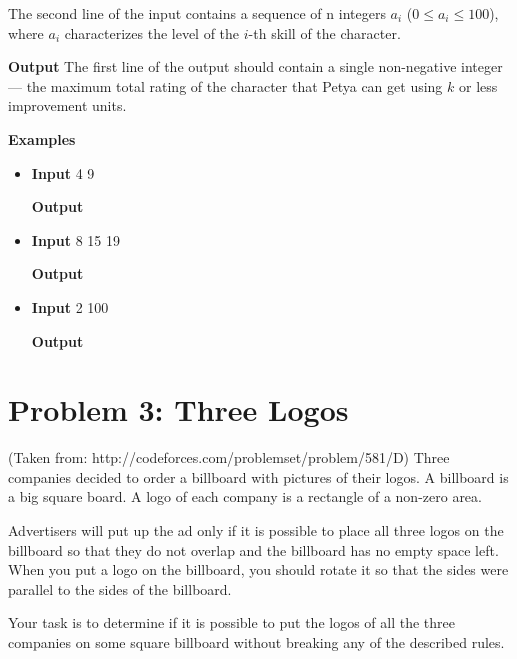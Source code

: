 \normalfont\documentclass[letterpaper,11pt]{article}
\begin{document}
The second line of the input contains a sequence of n integers $a_i$ ($0 \leq a_i \leq 100$), where $a_i$ characterizes the level of the $i$-th skill of the character.

\textbf{Output} \newline
The first line of the output should contain a single non-negative integer — the maximum total rating of the character that Petya can get using $k$ or less improvement units.

\textbf{Examples}
\begin{itemize}
\item \textbf{Input}  4  9

\textbf{Output} 

\item \textbf{Input}  8  15 19

\textbf{Output} 

\item \textbf{Input}  2  100

\textbf{Output} 

\end{itemize}

\newpage



\section*{Problem 3: Three Logos}
(Taken from: http://codeforces.com/problemset/problem/581/D) \newline
Three companies decided to order a billboard with pictures of their logos. A billboard is a big square board. A logo of each company is a rectangle of a non-zero area.

Advertisers will put up the ad only if it is possible to place all three logos on the billboard so that they do not overlap and the billboard has no empty space left. When you put a logo on the billboard, you should rotate it so that the sides were parallel to the sides of the billboard.

Your task is to determine if it is possible to put the logos of all the three companies on some square billboard without breaking any of the described rules.
\end{document}
